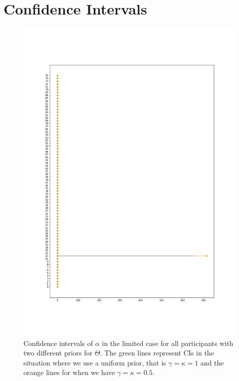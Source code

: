 \chapter{Confidence Intervals}
\label{appendix_CIs}
\begin{figure}
    \centering
    \includegraphics[scale=0.36]{pictures/Sensitivity/ci_lim_alpha.png}
    \caption[CIs for $\alpha$ in the limited case]{Confidence intervals of $\alpha$ in the limited case for all participants with two different priors for $\Theta$. The green lines represent CIs in the situation where we use a uniform prior, that is $\gamma=\kappa=1$ and the orange lines for when we have $\gamma=\kappa=0.5$.}
    \label{fig:sensitivity_cis_lim_alpha}
\end{figure}



